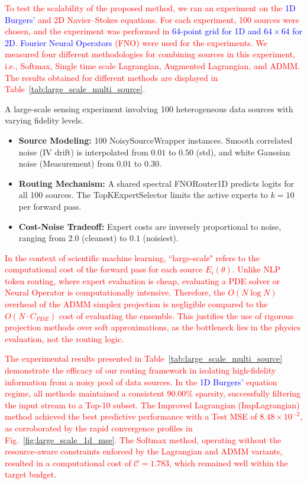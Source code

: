 \documentclass[preprint,12pt,authoryear]{elsarticle}
\begin{document}
\textcolor{red}{To test the scalability of the proposed method, we ran an experiment on the \textcolor{blue}{1D Burgers'} and 2D Navier--Stokes equations. For each experiment, 100 sources were chosen, and the experiment was performed in \textcolor{blue}{64-point grid for 1D and $64 \times 64$ for 2D}. \textcolor{blue}{Fourier Neural Operators} (FNO) were used for the experiments. We measured four different methodologies for combining sources in this experiment, i.e., Softmax, Single time scale Lagrangian, Augmented Lagrangian, and ADMM. The results obtained for different methods are displayed in Table~\ref{tab:large_scale_multi_source}.}

A large-scale sensing experiment involving 100 heterogeneous data sources with varying fidelity levels.


\begin{itemize}
    \item \textbf{Source Modeling:} 100 NoisySourceWrapper instances. Smooth correlated noise (IV drift) is interpolated from $0.01$ to $0.50$ (std), and white Gaussian noise (Measurement) from $0.01$ to $0.30$.
    \item \textbf{Routing Mechanism:} A shared spectral FNORouter1D predicts logits for all 100 sources. The TopKExpertSelector limits the active experts to $k=10$ per forward pass.
    \item \textbf{Cost-Noise Tradeoff:} Expert costs are inversely proportional to noise, ranging from $2.0$ (cleanest) to $0.1$ (noisiest).
\end{itemize}

\textcolor{red}{In the context of scientific machine learning, ``large-scale" refers to the computational cost of the forward pass for each source $E_i(\theta)$. Unlike NLP token routing, where expert evaluation is cheap, evaluating a PDE solver or Neural Operator is computationally intensive. Therefore, the $O(N \log N)$ overhead of the ADMM simplex projection is negligible compared to the $O(N \cdot C_{PDE})$ cost of evaluating the ensemble. This justifies the use of rigorous projection methods over soft approximations, as the bottleneck lies in the physics evaluation, not the routing logic.}

\textcolor{red}{The experimental results presented in Table~\ref{tab:large_scale_multi_source} demonstrate the efficacy of our routing framework in isolating high-fidelity information from a noisy pool of data sources. In the \textcolor{blue}{1D Burgers'} equation regime, all methods maintained a consistent $90.00\%$ sparsity, successfully filtering the input stream to a Top-10 subset. The Improved Lagrangian (ImpLagrangian) method achieved the best predictive performance with a Test MSE of $8.48 \times 10^{-2}$, as corroborated by the rapid convergence profiles in Fig.~\ref{fig:large_scale_1d_mse}. The Softmax method, operating without the resource-aware constraints enforced by the Lagrangian and ADMM variants, resulted in a computational cost of $\mathcal{C} = 1.783$, which remained well within the target budget.}
\end{document}
